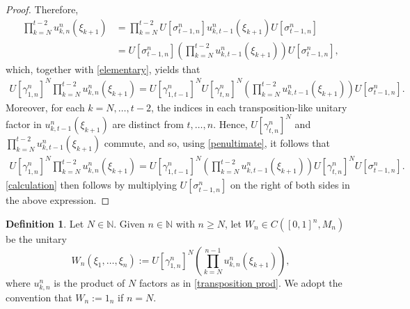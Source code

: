 \documentclass[12pt]{amsart}
\numberwithin{equation}{section}
\theoremstyle{definition}
\newtheorem{definition}[theorem]{Definition}
\theoremstyle{remark}
\newcommand{\NN}{\mathbb{N}}
\begin{document}
\begin{proof}
	Therefore,  
	$$
	\begin{aligned}
		\prod_{k=N}^{t-2}u^{n}_{k,n}(\xi_{k+1})&=\prod_{k=N}^{t-2}U[\sigma^{n}_{t-1,n}]u^{n}_{k,t-1}(\xi_{k+1})U[\sigma^{n}_{t-1,n}]\\
		&=U[\sigma^{n}_{t-1,n}]\left(\prod_{k=N}^{t-2}u^{n}_{k,t-1}(\xi_{k+1})\right)U[\sigma^{n}_{t-1,n}],
	\end{aligned}
	$$
	which, together with \autoref{elementary}, yields that
	\begin{equation}
		\label{penultimate}
		\begin{aligned}
			U[\gamma^{n}_{1,n}]^{N}\prod_{k=N}^{t-2}u^{n}_{k,n}(\xi_{k+1})
			=U[\gamma^{n}_{1,t-1}]^{N}U[\gamma^{n}_{t,n}]^{N}\left(\prod_{k=N}^{t-2}u^{n}_{k,t-1}(\xi_{k+1})\right)U[\sigma^{n}_{t-1,n}].
		\end{aligned}
	\end{equation}
	Moreover, for each $k=N,\ldots,t-2$, the indices in each transposition-like unitary factor in $u^{n}_{k,t-1}(\xi_{k+1})$ are distinct from $t,\ldots,n$. Hence,  $U[\gamma^{n}_{t,n}]^{N}$ and  $\prod_{k=N}^{t-2}u^{n}_{k,t-1}(\xi_{k+1})$ commute, and so, using \autoref{penultimate}, it follows that
	$$
	\begin{aligned}
		U[\gamma^{n}_{1,n}]^{N}\prod_{k=N}^{t-2}u^{n}_{k,n}(\xi_{k+1})
		=
		U[\gamma^{n}_{1,t-1}]^{N}\left(\prod_{k=N}^{t-2}u^{n}_{k,t-1}(\xi_{k+1})\right)U[\gamma^{n}_{t,n}]^{N}U[\sigma^{n}_{t-1,n}].
	\end{aligned}
	$$
	\autoref{calculation} then follows by multiplying $U[\sigma^{n}_{t-1,n}]$ on the right of both sides in the above expression. 
\end{proof}

\begin{definition}
	\label{ltmatrix}
	Let $N\in\NN$. Given $n\in\NN$ with $n\geq N$, let $W_{n}\in C([0,1]^{n},M_{n})$ be the unitary
	\begin{equation}
	\label{Wn}
	W_{n}(\xi_{1},\ldots,\xi_{n}):=U[\gamma^{n}_{1,n}]^{N}\left(\prod_{k=N}^{n-1}u^{n}_{k,n}(\xi_{k+1})\right),
	\end{equation}
	where $u_{k,n}^{n}$ is the product of $N$ factors as in \autoref{transposition prod}.
	We adopt the convention that $W_{n}:=1_{n}$ if $n=N$.
\end{definition}
\end{document}
